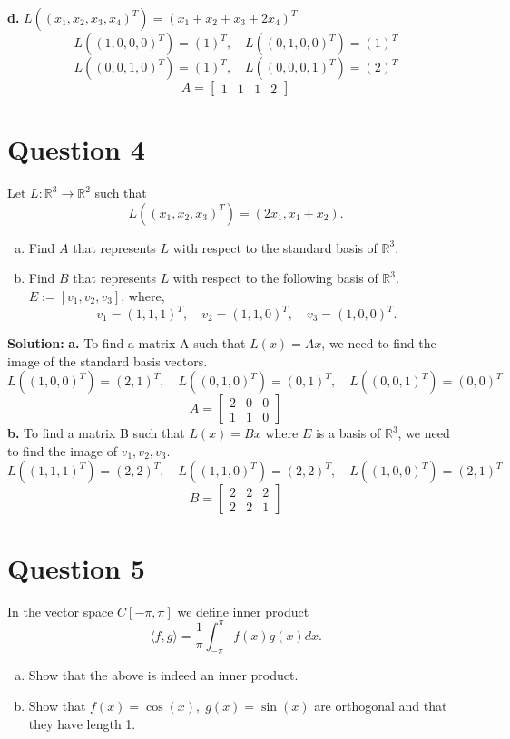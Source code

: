 \documentclass{article}
\begin{document}
\vspace{0.25cm}
\noindent\textbf{d.} $ L((x_1, x_2, x_3, x_4)^T) = (x_1 + x_2 + x_3 + 2x_4)^T $ \\
$$ L((1, 0, 0, 0)^T) = (1)^T, \quad L((0, 1, 0, 0)^T) = (1)^T $$
$$ L((0, 0, 1, 0)^T) = (1)^T, \quad L((0, 0, 0, 1)^T) = (2)^T $$
$$ A = \begin{bmatrix} 1 & 1 & 1 & 2 \end{bmatrix} $$


\section*{Question 4}
Let $L : \mathbb{R}^3 \to \mathbb{R}^2$ such that
$$ L((x_1, x_2, x_3)^T) = (2x_1, x_1 + x_2). $$
\begin{enumerate}[a.]
    \item Find $A$ that represents $L$ with respect to the standard basis of $\mathbb{R}^3$.
    \item Find $B$ that represents $L$ with respect to the following basis of $\mathbb{R}^3$. \\
    $E := [v_1, v_2, v_3]$, where, $$ v_1 = (1,1,1)^T, \quad v_2 = (1,1,0)^T, \quad v_3 = (1,0,0)^T. $$
\end{enumerate}

\noindent\textbf{Solution:}
\newline\noindent\textbf{a.} To find a matrix A such that $L(x) = Ax$, we need to find the image of the standard basis vectors.
$$ L((1, 0, 0)^T) = (2, 1)^T, \quad L((0, 1, 0)^T) = (0, 1)^T, \quad L((0, 0, 1)^T) = (0, 0)^T $$
$$ A = \begin{bmatrix} 2 & 0 & 0 \\ 1 & 1 & 0 \end{bmatrix} $$
\noindent\textbf{b.} To find a matrix B such that $L(x) = Bx$ where $E$ is a basis of $\mathbb{R}^3$, we need to find the image of $v_1, v_2, v_3$.
$$ L((1, 1, 1)^T) = (2, 2)^T, \quad L((1, 1, 0)^T) = (2, 2)^T, \quad L((1, 0, 0)^T) = (2, 1)^T $$
$$ B = \begin{bmatrix} 2 & 2 & 2 \\ 2 & 2 & 1 \end{bmatrix} $$

\newpage
\section*{Question 5}
In the vector space $C[-\pi, \pi]$ we define inner product
$$ \langle f, g \rangle = \frac{1}{\pi} \int_{-\pi}^{\pi} f(x)g(x)dx. $$
\begin{enumerate}[a.]
    \item Show that the above is indeed an inner product.
    \item Show that $f(x) = \cos(x), \; g(x) = \sin(x)$ are orthogonal and that they have length 1.
\end{enumerate}
\end{document}
